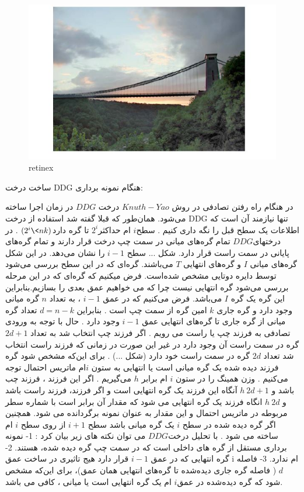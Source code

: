       \begin{figure}[!htb]
      	\includegraphics[width=\linewidth]{images/retinex1}
      	\caption{retinex}\label{fig:logtonemap}
      	\endminipage\hfill
      \end{figure}
ساخت درخت DDG  هنگام نمونه برداری: 



در هنگام راه رفتن تصادفی در روش $Knuth-Yao$ درخت $DDG $ در زمان اجرا ساخته می‌شود. همان‌طور که قبلا گفته شد استفاده از درخت DDG  تنها نیازمند آن است که اطلاعات یک سطح قبل را نگه داری کنیم . سطح$ i$ ام حداکثر$2^{i}$ تا گره دارد$(2^{i} \< nk)$  . در درختهای$ DDG$ تمام گره‌های میانی در سمت چپ درخت قرار دارند و تمام گره‌های پایانی در سمت راست قرار دارد.  شکل ... سطح $ i - 1$  را نشان می‌دهد. در این شکل گره‌های میانی $I$  و گره‌های انتهایی $T$  می‌باشند. گره‌ای که در این سطح بررسی می‌شود توسط دایره دوتایی مشخص شده‌است. فرض میکنیم که گره‌ای که در این مرحله  بررسی می‌شود گره انتهایی نیست چرا که می خواهیم عمق بعدی را بسازیم.بنابراین این گره یک گره $I$ می‌باشد. فرض می‌کنیم که در عمق $i - 1$  ،  به تعداد $n $ گره میانی وجود دارد و گره جاری $k$  امین گره از سمت چپ است . بنابراین $d= n - k$ تعداد گره میانی از گره جاری تا گره‌های انتهایی عمق $i - 1$ وجود دارد . حال با توجه به ورودی تصادفی به فرزند چپ یا راست می رویم . اگر فرزند چپ انتخاب شد به تعداد $2d + 1$ گره در سمت راست آن وجود دارد در غیر این صورت در زمانی که فرزند راست انتخاب شد تعداد $2d$  گره در سمت راست خود دارد (شکل ...) . برای این‌که مشخص شود گره فرزند دیده شده یک گره میانی است یا انتهایی به ستون $i $ام ماتریس احتمال توجه می‌کنیم . وزن همینگ را در ستون $i$  ام برابر $h$  می‌گیریم . اگر این فرزند ، فرزند چب باشد و $h\>  2d+ 1$ آنگاه این فرزند یک گره انتهایی است و اگر   فرزند، فرزند راست باشد و $h\> 2d$  انگاه فرزند یک گره انتهایی می شود که مقدار آن برابر است با  شماره سطر مربوطه در ماتریس احتمال و این مقدار به عنوان نمونه برگردانده می شود. همچنین اگر گره دیده شده در سطح $i$ یک گره میانی باشد  سطح $ i + 1$  از روی سطح $ i $ ام  ساخته می شود . 
با تحلیل درخت$ DDG $ می توان نکته های زیر بیان کرد :
1- نمونه برداری مستقل از گره های داخلی است  که در سمت چپ گره دیده شده، هستند. 
2- گره انتهایی که در عمق $i - 1$  قرار دارد هیج تاثیری در ساخت عمق i  ام ندارد. 
3- فاصله $d$ ( فاصله گره جاری دیده‌شده تا گره‌های انتهایی همان عمق)،  برای این‌که مشخص شود که گره دیده‌شده در عمق$ i$  ام  یک گره انتهایی است یا میانی ، کافی می باشد. 



